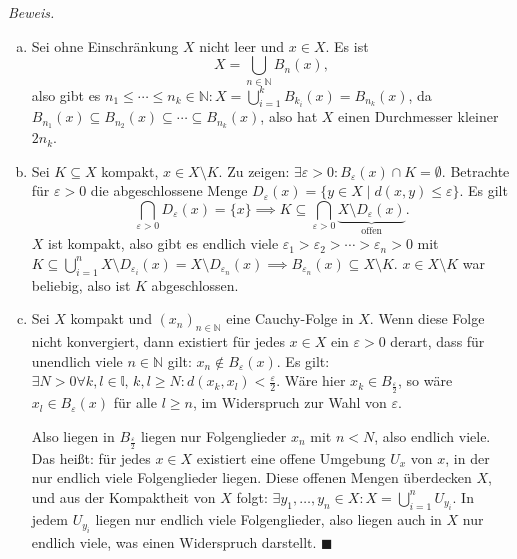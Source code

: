 \documentclass[12pt]{scrbook}   %
\begin{document}
{\it Beweis.} 
\begin{enumerate}[a)]
\item Sei ohne Einschränkung $X$ nicht leer und $x\in X$. 
Es ist $$X=\bigcup_{n\in \mathbb N} B_n(x),$$ also gibt es $n_1 \le \cdots \le n_k\in \mathbb N: X= \bigcup_{i=1}^kB_{k_i}(x)= B_{n_k}(x)$, da $B_{n_1}(x)\subseteq B_{n_2}(x) \subseteq \cdots \subseteq B_{n_k}(x)$, also hat $X$ einen Durchmesser kleiner $2n_k$.

\item Sei $K\subseteq X$ kompakt, $x\in X\setminus K$. Zu zeigen: $\exists \varepsilon > 0 : B_\varepsilon(x) \cap K = \emptyset$. Betrachte für $\varepsilon>0$ die abgeschlossene Menge $D_\varepsilon(x) = \{y\in X \mid d(x,y) \le \varepsilon\}$. Es gilt
$$ \bigcap_{\varepsilon >0} D_{\varepsilon}(x) = \{x\} \implies K\subseteq \bigcap_{\varepsilon>0} \underbrace{X\setminus D_{\varepsilon}(x)}_{\text {offen}}.$$
$X$ ist kompakt, also gibt es endlich viele $\varepsilon_1 > \varepsilon_2 > \cdots >\varepsilon_n >0$ mit $K\subseteq \bigcup _{i=1}^n X\setminus D_{\varepsilon_i}(x) = X \setminus D_{\varepsilon_n}(x) \implies B_{\varepsilon_n}(x) \subseteq X\setminus K$. $x\in X\setminus K$ war beliebig, also ist $K$ abgeschlossen.

\item Sei $X$ kompakt und $(x_n)_{n\in\mathbb N}$ eine Cauchy-Folge in $X$. Wenn diese Folge nicht konvergiert, dann existiert für jedes $x\in X$ ein $\varepsilon>0$ derart, dass für unendlich viele $n\in \mathbb N$ gilt: $x_n \notin B_\varepsilon(x)$. Es gilt: $\exists N > 0 \forall k, l \in \mathbb l,\, k,l\ge N: d(x_k,x_l) < \frac\varepsilon2$. Wäre hier $x_k \in B_{\frac \varepsilon 2}$, so wäre $x_l \in B_\varepsilon(x)$ für alle $l\ge n$, im Widerspruch zur Wahl von $\varepsilon$.

Also liegen in $B_{\frac\varepsilon2}$ liegen nur Folgenglieder $x_n$ mit $n<N$, also endlich viele. Das heißt: für jedes $x\in X$ existiert eine offene Umgebung $U_x$ von $x$, in der nur endlich viele Folgenglieder liegen. Diese offenen Mengen überdecken $X$, und aus der Kompaktheit von $X$ folgt: $\exists y_1,\ldots,y_n \in X: X= \bigcup_{i=1}^n U_{y_i}$. In jedem $U_{y_i}$ liegen nur endlich viele Folgenglieder, also liegen auch in $X$ nur endlich viele, was einen Widerspruch darstellt.  \hfill{$\blacksquare$}
\end{enumerate}
\end{document}
